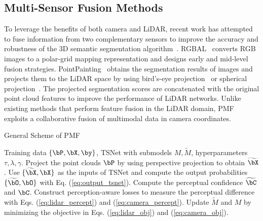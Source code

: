 \documentclass[10pt,twocolumn,letterpaper]{article}
\newcommand{\ice}[1]{{\color{black}#1}}
\begin{document}
\subsection{Multi-Sensor Fusion Methods}
\ice{To leverage the benefits of both camera and LiDAR, recent work has attempted to fuse information from two complementary sensors to improve the accuracy and robustness of the 3D semantic segmentation algorithm~\cite{krispel2020fuseseg,Madawy2019RGBAL,meyer2019sensor,vora2020pointpainting}.} RGBAL~\cite{Madawy2019RGBAL} converts RGB images to a polar-grid mapping representation and designs early and mid-level fusion strategies. 
PointPainting~\cite{vora2020pointpainting} obtains the segmentation results of images and projects them to the LiDAR space by using bird's-eye projection~\cite{zhang2020polarnet} or spherical projection~\cite{milioto2019rangenet++}. The projected segmentation scores are concatenated with the original point cloud features to improve the performance of LiDAR networks. 
Unlike existing methods that perform feature fusion in the LiDAR domain, PMF exploits a collaborative fusion of multimodal data in camera coordinates.













\begin{algorithm}[t]
    \caption{General Scheme of PMF}
    \begin{algorithmic}[1]
        \REQUIRE Training data $\{\bP,\bX,\by\}$, TSNet with submodels $M,\widetilde{M}$, hyperparameters $\tau,\lambda,\gamma$.
\STATE Project the point clouds $\bP$ by using perspective projection to obtain $\widetilde{\bX}$.
\STATE Use $\{\widetilde{\bX},\bX\}$ as the inputs of TSNet and compute the output probabilities $\{\widetilde{\bO},\bO\}$ with Eq. (\ref{eq:output_tsnet}).
            \STATE Compute the perceptual confidence $\widetilde{\bC}$ and $\bC$.
\STATE Construct perception-aware losses to measure the perceptual difference with Eqs. (\ref{eq:lidar_percept}) and (\ref{eq:camera_percept}).
            \STATE Update $\widetilde{M}$ and $M$ by minimizing the objective in Eqs. (\ref{eq:lidar_obj}) and (\ref{eq:camera_obj}).
        \ENDWHILE
    \end{algorithmic}
    \label{alg:optimization}
\end{algorithm}
\end{document}
